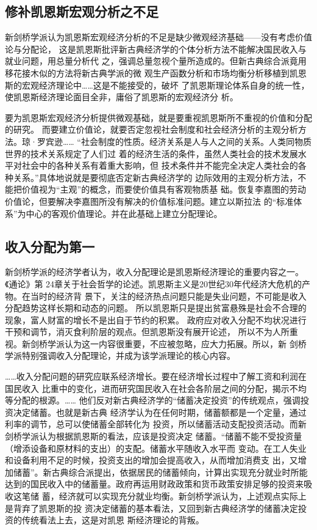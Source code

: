 \subsection{修补凯恩斯宏观分析之不足}

新剑桥学派认为凯恩斯宏观经济分析的不足是缺少微观经济基础——没有考虑价值论与分配论，
这是凯恩斯批评新古典经济学的个体分析方法不能解决国民收入与就业问题，用总量分析代
之，强调总量忽视个量所造成的。但新古典综合派竟用移花接木似的方法将新古典学派的微
观生产函数分析和市场均衡分析移植到凯恩斯的宏观经济理论中……这是不能接受的，破坏
了凯恩斯理论体系自身的统一性，使凯恩斯经济理论面目全非，庸俗了凯恩斯的宏观经济分
析。

要为凯恩斯宏观经济分析提供微观基础，就是要重视凯恩斯所不重视的价值和分配的研究。
而要建立价值论，就要否定忽视社会制度和社会经济分析的主观分析方法。琼·罗宾逊……
“社会制度的性质。经济关系是人与人之间的关系。人类同物质世界的技术关系规定了人们过
着的经济生活的条件，虽然人类社会的技术发展水平对社会中的各种关系有着重大影响，但
技术条件并不能完全决定人类社会的各种关系。”具体地说就是要彻底否定新古典经济学的
边际效用的主观分析方法，不能把价值视为“主观”的概念，而要使价值具有客观物质基
础。恢复李嘉图的劳动价值论，但要解决李嘉图所没有解决的价值标准问题。建立以斯拉法
的“标准体系”为中心的客观价值理论。并在此基础上建立分配理论。

\subsection{收入分配为第一}

新剑桥学派的经济学者认为，收入分配理论是凯恩斯经济理论的重要内容之一。《通论》第
24章关于社会哲学的论述。凯恩斯主义是20世纪30年代经济大危机的产物。在当时的经济背
景下，关注的经济热点问题只能是失业问题，不可能是收入分配趋势这样长期和动态的问题。
所以凯恩斯只是提出贫富悬殊是社会不合理的现象，富人财富的增长不是出自于节约的积累。
政府应对收入分配不均状况进行干预和调节，消灭食利阶层的观点。但凯恩斯没有展开论述，
所以不为人所重视。新剑桥学派认为这一内容很重要，不应被忽略，应大力拓展。所以，新
剑桥学派特别强调收入分配理论，并成为该学派理论的核心内容。

……收入分配问题的研究应联系经济增长。要在经济增长过程中了解工资和利润在国民收入
比重中的变化，进而研究国民收入在社会各阶层之间的分配，揭示不均等分配的根源。……
他们反对新古典经济学的“储蓄决定投资”的传统观点，强调投资决定储蓄。也就是新古典
经济学认为在任何时期，储蓄额都是一个定量，通过利率的调节，总可以使储蓄全部转化为
投资，所以储蓄活动支配投资活动。而新剑桥学派认为根据凯恩斯的看法，应该是投资决定
储蓄。“储蓄不能不受投资量（增添设备和原材料的支出）的支配。储蓄水平随收入水平而
变动。在工人失业和设备利用不足的时候，投资支出的增加会提高收入，从而增加消费支
出，又增加储蓄”。新古典综合派提出，依据居民的储蓄倾向，计算出实现充分就业时所能
达到的国民收入中的储蓄量。政府再运用财政政策和货币政策安排足够的投资来吸收这笔储
蓄，经济就可以实现充分就业均衡。新剑桥学派认为，上述观点实际上是背弃了凯恩斯的投
资决定储蓄的基本看法，又回到新古典经济学的储蓄决定投资的传统看法上去，这是对凯恩
斯经济理论的背叛。

